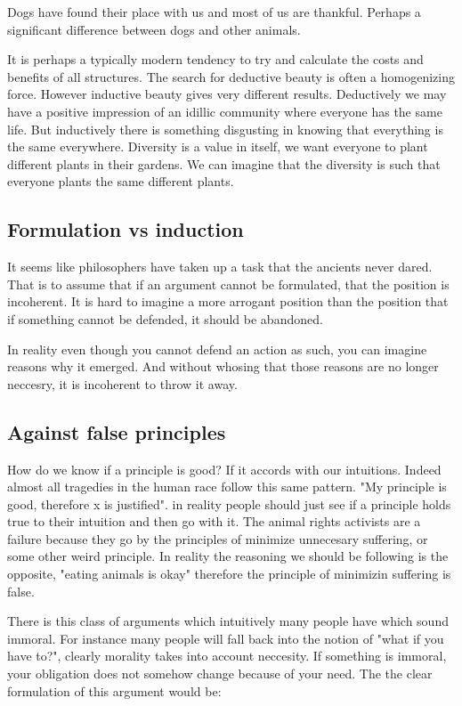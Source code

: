 \documentclass[12pt]{report}
\numberwithin{equation}{section}
\begin{document}
Dogs have found their place with us and most of us are thankful. Perhaps a significant difference between dogs and other animals. 

It is perhaps a typically modern tendency to try and calculate the costs and benefits of all structures.  The search for deductive beauty is often a homogenizing force. However inductive beauty gives very different results. Deductively we may have a positive impression of an idillic community where everyone has the same life. But inductively there is something disgusting in knowing that everything is the same everywhere. Diversity is a value in itself, we want everyone to plant different plants in their gardens. We can imagine that the diversity is such that everyone plants the same different plants. 


\subsection{Formulation vs induction}
It seems like philosophers have taken up a task that the ancients never dared. That is to assume that if an argument cannot be formulated, that the position is incoherent. It is hard to imagine a more arrogant position than the position that if something cannot be defended, it should be abandoned. 

In reality even though you cannot defend an action as such, you can imagine reasons why it emerged. And without whosing that those reasons are no longer neccesry, it is incoherent to throw it away. 

\subsection{Against false principles}

How do we know if a principle is good? If it accords with our intuitions. Indeed almost all tragedies in the human race follow this same pattern. "My principle is good, therefore x is justified". in reality people should just see if a principle holds true to their intuition and then go with it. The animal rights activists are a failure because they go by the principles of minimize unnecesary suffering, or some other weird principle. In reality the reasoning we should be following is the opposite, "eating animals is okay" therefore the principle of minimizin suffering is false. 

There is this class of arguments which intuitively many people have which sound immoral. For instance many people will fall back into the notion of "what if you have to?", clearly morality takes into account neccesity. If something is immoral, your obligation does not somehow change because of your need. The the clear formulation of this argument would be:
\end{document}
